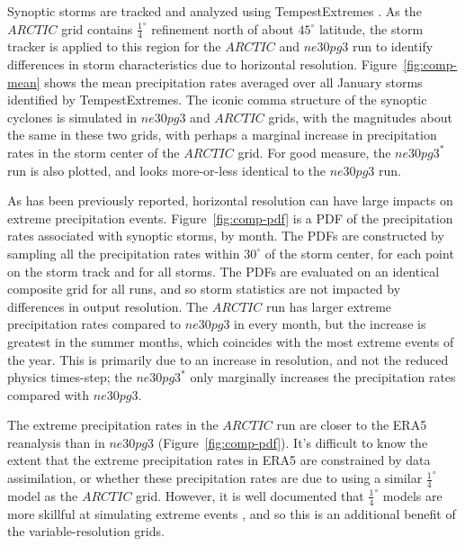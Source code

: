 \documentclass[draft]{agujournal2019}
\begin{document}
Synoptic storms are tracked and analyzed using TempestExtremes \cite{UETAL2021}. As the $ARCTIC$ grid contains $\frac{1}{4}^{\circ}$ refinement north of about $45^{\circ}$ latitude, the storm tracker is applied to this region for the $ARCTIC$ and $ne30pg3$ run to identify differences in storm characteristics due to horizontal resolution. Figure~\ref{fig:comp-mean} shows the mean precipitation rates averaged over all January storms identified by TempestExtremes. The iconic comma structure of the synoptic cyclones is simulated in $ne30pg3$ and $ARCTIC$ grids, with the magnitudes about the same in these two grids, with perhaps a marginal increase in precipitation rates in the storm center of the $ARCTIC$ grid. For good measure, the $ne30pg3^{*}$ run is also plotted, and looks more-or-less identical to the $ne30pg3$ run.

As has been previously reported, horizontal resolution can have large impacts on extreme precipitation events. Figure~\ref{fig:comp-pdf} is a PDF of the precipitation rates associated with synoptic storms, by month. The PDFs are constructed by sampling all the precipitation rates within $30^{\circ}$ of the storm center, for each point on the storm track and for all storms. The PDFs are evaluated on an identical composite grid for all runs, and so storm statistics are not impacted by differences in output resolution. The $ARCTIC$ run has larger extreme precipitation rates compared to $ne30pg3$ in every month, but the increase is greatest in the summer months, which coincides with the most extreme events of the year. This is primarily due to an increase in resolution, and not the reduced physics times-step; the $ne30pg3^{*}$ only marginally increases the precipitation rates compared with $ne30pg3$.

The extreme precipitation rates in the $ARCTIC$ run are closer to the ERA5 reanalysis than in $ne30pg3$ (Figure~\ref{fig:comp-pdf}). It's difficult to know the extent that the extreme precipitation rates in ERA5 are constrained by data assimilation, or whether these precipitation rates are due to using a similar $\frac{1}{4}^{\circ}$ model as the $ARCTIC$ grid. However, it is well documented that $\frac{1}{4}^{\circ}$ models are more skillful at simulating extreme events \cite{BetAl2013JC,OETAL2016JAMES}, and so this is an additional benefit of the variable-resolution grids.

\end{document}
